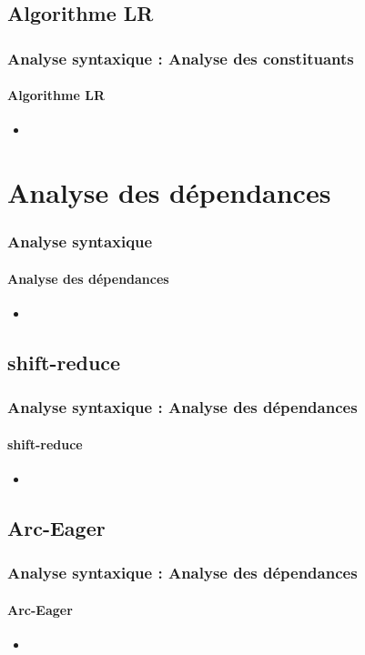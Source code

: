 \documentclass[xcolor=table]{beamer}
\begin{document}
\subsection{Algorithme LR}

\begin{frame}
\frametitle{Analyse syntaxique : Analyse des constituants}
\framesubtitle{Algorithme LR}

\begin{itemize}
	\item 
\end{itemize}

\end{frame}

\section{Analyse des dépendances}

\begin{frame}
\frametitle{Analyse syntaxique}
\framesubtitle{Analyse des dépendances}

\begin{itemize}
	\item 
\end{itemize}

\end{frame}

\subsection{shift-reduce}

\begin{frame}
\frametitle{Analyse syntaxique : Analyse des dépendances}
\framesubtitle{shift-reduce}

\begin{itemize}
	\item 
\end{itemize}

\end{frame}

\subsection{Arc-Eager}

\begin{frame}
\frametitle{Analyse syntaxique : Analyse des dépendances}
\framesubtitle{Arc-Eager}

\begin{itemize}
	\item 
\end{itemize}

\end{frame}
\end{document}
